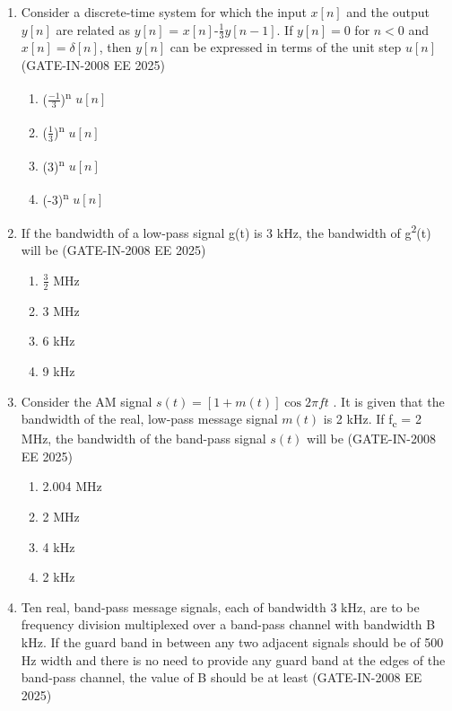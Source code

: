 \documentclass[journal,12pt,onecolumn]{IEEEtran}
\theoremstyle{remark}
\begin{document}
\begin{enumerate}[label=Q.\arabic*,start=1]
    \item Consider a discrete-time system for which the input $x[n]$ and the output $y[n]$ are related as $y[n]$ = $x[n]$-\(\frac{1}{3}\)$y[n-1]$. If $y[n] = 0$ for $n < 0$ and $x[n] = \delta[n]$, then $y[n]$ can be expressed in terms of the unit step $u[n]$ (GATE-IN-2008 EE 2025)
    \begin{enumerate} 
      \item (\(\frac{-1}{3}\))\textsuperscript{n} $u[n]$ 
      \item (\(\frac{1}{3}\))\textsuperscript{n} $u[n]$
      \item (3)\textsuperscript{n} $u[n]$
      \item (-3)\textsuperscript{n} $u[n]$
    \end{enumerate}  

    \item  If the bandwidth of a low-pass signal g(t) is 3 kHz, the bandwidth of g\textsuperscript{2}(t) will be    (GATE-IN-2008 EE 2025)
    \begin{enumerate} 
            \item \(\frac{3}{2}\) MHz 
            \item 3 MHz
            \item 6 kHz
            \item 9 kHz
   \end{enumerate}

   \item Consider the AM signal $s(t) = [1+ m(t)]\cos{2{\pi}ft}$ . It is given that the bandwidth of the real, low-pass message signal $m(t)$ is 2 kHz. If f\textsubscript{c} = 2 MHz, the bandwidth of the band-pass signal $s(t)$ will be (GATE-IN-2008 EE 2025)

    \begin{enumerate} 
            \item  2.004 MHz
            \item  2 MHz
            \item  4 kHz
            \item  2 kHz
     \end{enumerate}

         \item Ten real, band-pass message signals, each of bandwidth 3 kHz, are to be frequency division multiplexed over a band-pass channel with bandwidth B kHz. If the guard band in between any two adjacent signals should be of 500 Hz width and there is no need to provide any guard band at the edges of the band-pass channel, the value of B should be at least (GATE-IN-2008 EE 2025)


\end{enumerate}
\end{document}
